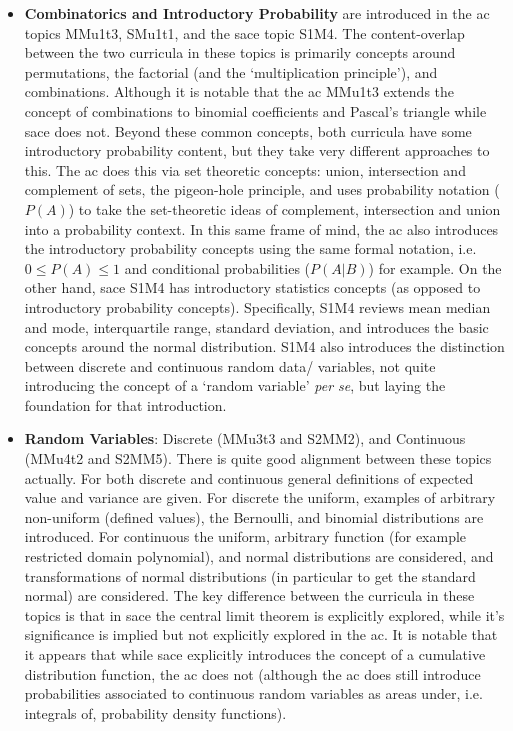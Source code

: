 \documentclass[twoside,12pt,a4paper]{report}
\begin{document}
\begin{itemize}
	\item \textbf{Combinatorics and Introductory Probability} are introduced in the \gls{ac} topics MMu1t3, SMu1t1, and the \gls{sace} topic S1M4. The content-overlap between the two curricula in these topics is primarily concepts around permutations, the factorial (and the `multiplication principle'), and combinations. Although it is notable that the \gls{ac} MMu1t3 extends the concept of combinations to binomial coefficients and Pascal's triangle while \gls{sace} does not. Beyond these common concepts, both curricula have some introductory probability content, but they take very different approaches to this. The \gls{ac} does this via set theoretic concepts: union, intersection and complement of sets, the pigeon-hole principle, and uses probability notation ($P(A)$) to take the set-theoretic ideas of complement, intersection and union into a probability context. In this same frame of mind, the \gls{ac} also introduces the introductory probability concepts using the same formal notation, i.e. $0 \leq P(A) \leq 1$ and conditional probabilities ($P(A|B)$) for example. On the other hand, \gls{sace} S1M4 has introductory statistics concepts (as opposed to introductory probability concepts). Specifically, S1M4 reviews mean median and mode, interquartile range, standard deviation, and introduces the basic concepts around the normal distribution. S1M4 also introduces the distinction between discrete and continuous random data/ variables, not quite introducing the concept of a `random variable' \emph{per se}, but laying the foundation for that introduction.  
	\item \textbf{Random Variables}: Discrete (MMu3t3 and S2MM2), and Continuous (MMu4t2 and S2MM5). There is quite good alignment between these topics actually. For both discrete and continuous general definitions of expected value and variance are given. For discrete the uniform, examples of arbitrary non-uniform (defined values), the Bernoulli, and binomial distributions are introduced. For continuous the uniform, arbitrary function (for example restricted domain polynomial), and normal distributions are considered, and transformations of normal distributions (in particular to get the standard normal) are considered. The key difference between the curricula in these topics is that in \gls{sace} the central limit theorem is explicitly explored, while it's significance is implied but not explicitly explored in the \gls{ac}. It is notable that it appears that while \gls{sace} explicitly introduces the concept of a cumulative distribution function, the \gls{ac} does not (although the \gls{ac} does still introduce probabilities associated to continuous random variables as areas under, i.e. integrals of, probability density functions).

\end{itemize}
\end{document}
